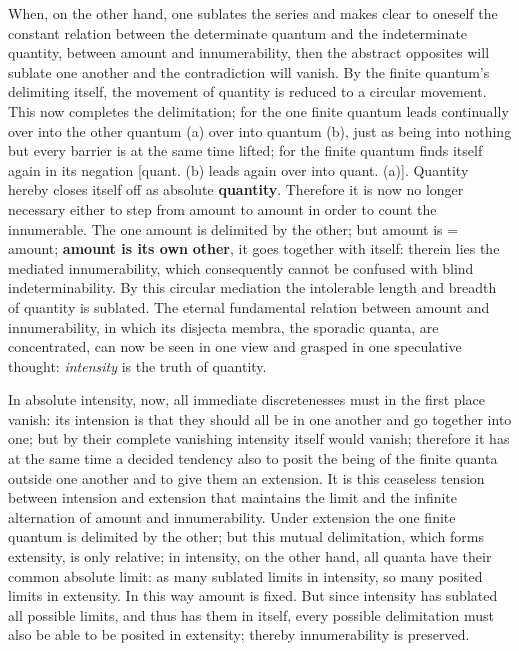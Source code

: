 \documentclass[12pt,a4paper,openany]{book}
\newcommand{\opage}[1]{\marginnote{\footnotesize\textit{[#1]}}}
\begin{document}
When, on the other hand, one sublates the series and makes clear to oneself the constant relation between the determinate
\setcounter{footnote}{0}%
\opage{42}quantum and the indeterminate quantity, between amount and innumerability, then the abstract opposites will sublate one another and the contradiction will vanish. By the finite quantum's delimiting itself, the movement of quantity is reduced to a circular movement. This now completes the delimitation; for the one finite quantum leads continually over into the other quantum (a) over into quantum (b), just as being into nothing but every barrier is at the same time lifted; for the finite quantum finds itself again in its negation [quant. (b) leads again over into quant. (a)]. Quantity hereby closes itself off as absolute \textbf{quantity}. Therefore it is now no longer necessary either to step from amount to amount in order to count the innumerable. The one amount is delimited by the other; but amount is = amount; \textbf{amount is its own} \textbf{other}, it goes together with itself: therein lies the mediated innumerability, which consequently cannot be confused with blind indeterminability. By this circular mediation the intolerable length and breadth of quantity is sublated. The eternal fundamental relation between amount and innumerability, in which its disjecta membra, the sporadic quanta, are concentrated, can now be seen in one view and grasped in one speculative thought: \emph{intensity} is the truth of quantity.

In absolute intensity, now, all immediate discretenesses must in the first place vanish: its intension is that they should all be in one another and go together into one; but by their complete vanishing intensity itself would vanish; therefore it has at the same time a decided tendency also to posit the being of the finite quanta outside one another and to give them an extension. It is this ceaseless tension between intension and extension that maintains the limit and the infinite alternation of amount and innumerability.
\setcounter{footnote}{0}%
\opage{43}Under extension the one finite quantum is delimited by the other; but this mutual delimitation, which forms extensity, is only relative; in intensity, on the other hand, all quanta have their common absolute limit: as many sublated limits in intensity, so many posited limits in extensity. In this way amount is fixed. But since intensity has sublated all possible limits, and thus has them in itself, every possible delimitation must also be able to be posited in extensity; thereby innumerability is preserved.
\end{document}
